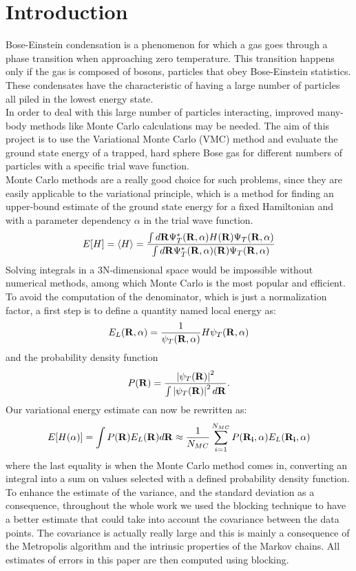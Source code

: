 \documentclass[10pt,a4paper,titlepage]{article}
\begin{document}
\section*{Introduction}
\noindent Bose-Einstein condensation is a phenomenon for which a gas goes through a phase transition when approaching zero temperature. This transition happens only if the gas is composed of bosons, particles that obey Bose-Einstein statistics. These condensates have the characteristic of having a large number of particles all piled in the lowest energy state. \\
In order to deal with this large number of particles interacting, improved many-body methods like Monte Carlo calculations may be needed.  The aim of this project is to use the Variational Monte Carlo
(VMC) method and evaluate the ground state energy of a trapped, hard
sphere Bose gas for different numbers of particles with a specific
trial wave function.\\
Monte Carlo methods are a really good choice for such problems, since they are easily applicable to the variational principle, which is a method for finding an upper-bound estimate of the ground state energy for a fixed Hamiltonian and with a parameter dependency $\alpha$ in the trial wave function.
\[
   E[H]=\langle H \rangle =
   \frac{\int d {\bf R}\Psi^{\ast}_{T}({\bf R},\alpha)H({\bf R})\Psi_{T}({\bf R},\alpha)}
        {\int d {\bf R}\Psi^{\ast}_{T}({\bf R},\alpha)({\bf R})\Psi_{T}({\bf R},\alpha)}
\]
Solving integrals in a 3N-dimensional space would be impossible without numerical methods, among which Monte Carlo is the most popular and efficient. \\
To avoid the computation of the denominator, which is just a normalization factor, a first step is to define a quantity named local energy as:
\[
   E_L({\bf R},\alpha)=\frac{1}{\psi_T({\bf R},\alpha)}H\psi_T({\bf R},\alpha)
   \label{eq:locale1}
\]
and the probability density function
\[
   P({\bf R})= \frac{\left|\psi_T({\bf R})\right|^2}{\int \left|\psi_T({\bf R})\right|^2d{\bf R}}.
\]
Our variational energy estimate can now be rewritten as:
\[
  E[H(\alpha)]=\int P({\bf R})E_L({\bf R}) d{\bf R}\approx \frac{1}{N_{MC}}\sum_{i=1}^{N_{MC}} P({\bf R_i},\alpha)E_L({\bf R_i},\alpha)
  \label{eq:vmc1}
\]
where the last equality is when the Monte Carlo method comes in, converting an integral into a sum on values selected with a defined probability density function.\\
To enhance the estimate of the variance, and the standard deviation as a consequence, throughout the whole work we used the blocking technique to have a better estimate that could take into account the covariance between the data points. The covariance is actually really large and this is mainly a consequence of the Metropolis algorithm and the intrinsic properties of the Markov chains. All estimates of errors in this paper are then computed using blocking.
\end{document}
